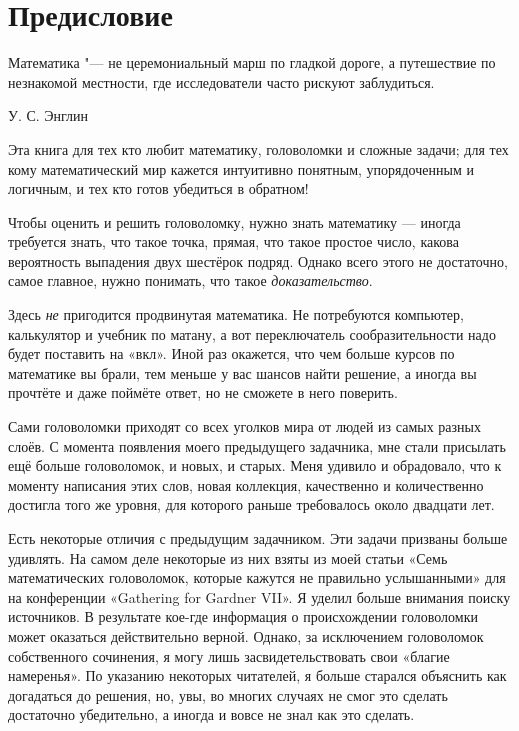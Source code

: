 \chapter{Предисловие}

\setlength{\epigraphwidth}{.6\textwidth}
\epigraph{Математика "--- не церемониальный марш по гладкой дороге, а путешествие по незнакомой местности, где исследователи часто рискуют заблудиться.
}{У. С. Энглин
}

Эта книга для тех кто любит математику, головоломки и сложные задачи;
для тех кому математический мир кажется интуитивно понятным, упорядоченным и логичным, и тех кто готов убедиться в обратном!

Чтобы оценить и решить головоломку, нужно знать математику --- 
иногда требуется знать, что такое точка, прямая, что такое простое число, какова вероятность выпадения двух шестёрок подряд. Однако всего этого не достаточно, самое главное, нужно понимать, что такое \emph{доказательство}.

Здесь \emph{не} пригодится продвинутая математика.
Не потребуются компьютер, калькулятор и учебник по матану,
а вот переключатель сообразительности надо будет поставить на «вкл».
Иной раз окажется, что чем больше курсов по математике вы брали, тем меньше у вас шансов найти решение,
а иногда вы прочтёте и даже поймёте ответ, но не сможете в него поверить.

Сами головоломки приходят со всех уголков мира от людей из самых разных слоёв.
С момента появления моего предыдущего задачника, мне стали присылать ещё больше головоломок, и новых, и старых.
Меня удивило и обрадовало, что к моменту написания этих слов, новая коллекция, качественно и количественно достигла того же уровня, для которого раньше требовалось около двадцати лет.

Есть некоторые отличия с предыдущим задачником.
Эти задачи призваны больше удивлять.
На самом деле некоторые из них взяты из моей статьи «Семь математических головоломок, которые кажутся не правильно услышанными» \cite{winkler-7} для на конференции «Gathering for Gard\-ner VII».
Я уделил больше внимания поиску источников.
В результате кое-где информация о происхождении головоломки может оказаться действительно верной.
Однако, за исключением головоломок собственного сочинения, я могу лишь засвидетельствовать свои «благие намеренья».
По указанию некоторых читателей, я больше старался объяснить как догадаться до решения,
но, увы, во многих случаях не смог это сделать достаточно убедительно, а иногда и вовсе не знал как это сделать.

